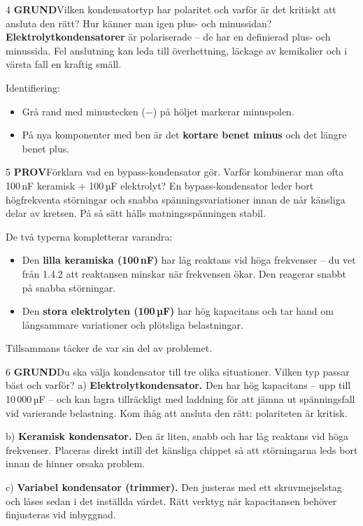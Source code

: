 \documentclass[a4paper,11pt,twoside]{book}
\newcommand{\qgrund}{\colorbox{greenpale}{\textcolor{greendark}{\headingfont\bfseries\tiny GRUND}}}
\newcommand{\qprov}{\colorbox{redpale}{\textcolor{reddark}{\headingfont\bfseries\tiny PROV}}}
\begin{document}
\begin{facitblock}{4}
\qgrund\quad Vilken kondensatortyp har polaritet och varför är det kritiskt att ansluta den rätt? Hur känner man igen plus- och minussidan?
\tcblower
\textbf{Elektrolytkondensatorer} är polariserade -- de har en definierad plus- och minussida. Fel anslutning kan leda till överhettning, läckage av kemikalier och i värsta fall en kraftig smäll.

Identifiering:
\begin{itemize}
  \item Grå rand med minustecken (${-}$) på höljet markerar minuspolen.
  \item På nya komponenter med ben är det \textbf{kortare benet minus} och det längre benet plus.
\end{itemize}
\end{facitblock}

\begin{facitblock}{5}
\qprov\quad Förklara vad en bypass-kondensator gör. Varför kombinerar man ofta 100\,nF keramisk + 100\,µF elektrolyt?
\tcblower
En bypass-kondensator leder bort högfrekventa störningar och snabba spänningsvariationer innan de når känsliga delar av kretsen. På så sätt hålls matningsspänningen stabil.

De två typerna kompletterar varandra:
\begin{itemize}
  \item Den \textbf{lilla keramiska (100\,nF)} har låg reaktans vid höga frekvenser -- du vet från 1.4.2 att reaktansen minskar när frekvensen ökar. Den reagerar snabbt på snabba störningar.
  \item Den \textbf{stora elektrolyten (100\,µF)} har hög kapacitans och tar hand om långsammare variationer och plötsliga belastningar.
\end{itemize}
Tillsammans täcker de var sin del av problemet.
\end{facitblock}

\begin{facitblock}{6}
\qgrund\quad Du ska välja kondensator till tre olika situationer. Vilken typ passar bäst och varför?
\tcblower
a) \textbf{Elektrolytkondensator.} Den har hög kapacitans -- upp till 10\,000\,µF -- och kan lagra tillräckligt med laddning för att jämna ut spänningsfall vid varierande belastning. Kom ihåg att ansluta den rätt: polariteten är kritisk.

b) \textbf{Keramisk kondensator.} Den är liten, snabb och har låg reaktans vid höga frekvenser. Placeras direkt intill det känsliga chippet så att störningarna leds bort innan de hinner orsaka problem.

c) \textbf{Variabel kondensator (trimmer).} Den justeras med ett skruvmejselstag och låses sedan i det inställda värdet. Rätt verktyg när kapacitansen behöver finjusteras vid inbyggnad.
\end{facitblock}
\end{document}
